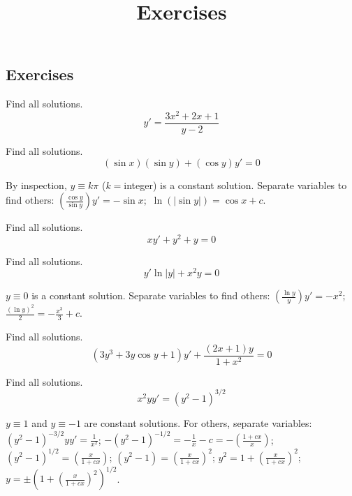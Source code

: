 \documentclass{ximera}
\title{Exercises} \license{CC BY-NC-SA 4.0}
\begin{document}
\begin{abstract}
\end{abstract}
\maketitle

\begin{onlineOnly}
\section*{Exercises}
\end{onlineOnly}


\begin{problem}\label{exer:2.2.1} Find all solutions.
$$y'=\frac{3x^2+2x+1}{y-2}$$
\end{problem}

\begin{problem}\label{exer:2.2.2} Find all solutions.
$$(\sin x)(\sin y)+(\cos y)y'=0$$

 

\begin{solution}
    By inspection, $y\equiv k\pi$ ($k=$integer) is a constant solution.
Separate variables to find others: $\left(\frac{\cos y}{\sin
y}\right)y'=-\sin x$;\ $\ln (|\sin y|)=\cos x+c$.
\end{solution}

\end{problem}

 \begin{problem}\label{exer:2.2.3} Find all solutions.
 $$xy'+y^2+y=0$$
 \end{problem}
 
\begin{problem}\label{exer:2.2.4} Find all solutions.
$$y' \ln |y|+x^2y= 0$$

 

\begin{solution}
     $y\equiv0$ is a  constant solution.
Separate variables to find others: $\left(\frac{\ln y}{y}\right)y'=-x^2$;\ $\frac{(\ln y)^2}{2}=-\frac{x^3}{3}+c$.
\end{solution}
\end{problem}

\begin{problem}\label{exer:2.2.5} Find all solutions.
$$(3y^3+3y \cos y+1)y'+\frac{(2x+1)y}{1+x^2}=0$$
\end{problem}

\begin{problem}\label{exer:2.2.6} Find all solutions.
$$x^2yy'=(y^2-1)^{3/2}$$

 

\begin{solution}
    $y\equiv1$ and $y\equiv-1$ are constant solutions.
For others, separate variables:
$(y^2-1)^{-3/2}yy'=\frac{1}{ x^2}$;\;
$-(y^2-1)^{-1/2}=-\frac{1}{ x}-c=-\left(\frac{1+cx}{ x}\right)$;\;
$(y^2-1)^{1/2}=\left(\frac{x}{1+cx}\right)$;\;
$(y^2-1)=\left(\frac{x}{1+cx}\right)^2$;\;
$y^2=1+\left(\frac{x}{1+cx}\right)^2$;\;
$y=\pm\left(1+\left(\frac{x}{1+cx}\right)^2\right)^{1/2}$.
\end{solution}
\end{problem}
\end{document}
